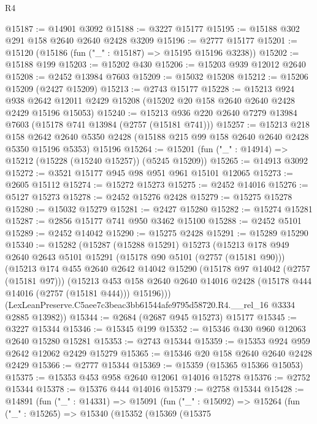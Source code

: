 \begin{lexlean}{R4}
\begin{coremodule}
@15187 := @14901 @3092
@15188 := @3227 @15177
@15195 := @15188 @302 @291 @158 @2640 @2640 @2428 @3209
@15196 := @2777 @15177
@15201 := @15120 (@15186 (fun ("_" : @15187) => @15195 @15196 @3238))
@15202 := @15188 @199
@15203 := @15202 @430
@15206 := @15203 @939 @12012 @2640
@15208 := @2452 @13984 @7603
@15209 := @15032 @15208
@15212 := @15206 @15209 (@2427 @15209)
@15213 := @2743 @15177
@15228 := @15213
    @924
    @938
    @2642
    @12011
    @2429
    @15208
    (@15202 @20 @158 @2640 @2640 @2428 @2429 @15196 @15053)
@15240 := @15213 @936 @220 @2640 @7279 @13984 @7603 (@15178 @741 @13984 (@2757 (@15181 @741)))
@15257 := @15213
    @218
    @158
    @2642
    @2640
    @5350
    @2428
    (@15188 @215 @99 @158 @2640 @2640 @2428 @5350 @15196 @5353)
    @15196
@15264 := @15201 (fun ("_" : @14914) => @15212 (@15228 (@15240 @15257)) (@5245 @15209))
@15265 := @14913 @3092
@15272 := @3521 @15177 @945 @98 @951 @961 @15101 @12065
@15273 := @2605 @15112
@15274 := @15272 @15273
@15275 := @2452 @14016
@15276 := @5127 @15273
@15278 := @2452 @15276 @2428
@15279 := @15275 @15278
@15280 := @15032 @15279
@15281 := @2427 @15280
@15282 := @15274 @15281
@15287 := @2856 @15177 @741 @950 @3462 @15100
@15288 := @2452 @5101
@15289 := @2452 @14042
@15290 := @15275 @2428
@15291 := @15289 @15290
@15340 := @15282
    (@15287
      (@15288 @15291)
      @15273
      (@15213
        @178
        @949
        @2640
        @2643
        @5101
        @15291
        (@15178 @90 @5101 (@2757 (@15181 @90)))
        (@15213
          @174
          @455
          @2640
          @2642
          @14042
          @15290
          (@15178 @97 @14042 (@2757 (@15181 @97)))
          (@15213
            @453
            @158
            @2640
            @2640
            @14016
            @2428
            (@15178 @444 @14016 (@2757 (@15181 @444)))
            @15196)))
      (LexLeanPreserve.C5aee7c3beac3bb61544afe9795d58720.R4.__rel_16 @3334 @2885 @13982))
@15344 := @2684 (@2687 @945 @15273) @15177
@15345 := @3227 @15344
@15346 := @15345 @199
@15352 := @15346 @430 @960 @12063 @2640 @15280 @15281
@15353 := @2743 @15344
@15359 := @15353 @924 @959 @2642 @12062 @2429 @15279
@15365 := @15346 @20 @158 @2640 @2640 @2428 @2429
@15366 := @2777 @15344
@15369 := @15359 (@15365 @15366 @15053)
@15375 := @15353 @453 @958 @2640 @12061 @14016 @15278
@15376 := @2752 @15344
@15378 := @15376 @444 @14016
@15379 := @2758 @15344
@15428 := @14891
    (fun ("_" : @14331) =>
    @15091
      (fun ("_" : @15092) =>
      @15264
        (fun ("_" : @15265) =>
        @15340
          (@15352
            (@15369
              (@15375

\end{coremodule}
\end{lexlean}
